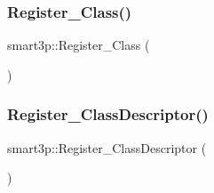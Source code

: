 \subsubsection{\texorpdfstring{Register\+\_\+\+Class()}{Register\_Class()}}
{\footnotesize\ttfamily smart3p\+::\+Register\+\_\+\+Class (\begin{DoxyParamCaption}\item[{\hyperlink{classsmart3p_1_1SMPacket}{S\+M\+Packet}}]{ }\end{DoxyParamCaption})}

\mbox{\label{namespacesmart3p_a688f712691acb3e8426a0252eba1329a}} 
\subsubsection{\texorpdfstring{Register\+\_\+\+Class\+Descriptor()}{Register\_ClassDescriptor()}}
{\footnotesize\ttfamily smart3p\+::\+Register\+\_\+\+Class\+Descriptor (\begin{DoxyParamCaption}\item[{\hyperlink{classsmart3p_1_1SMPacketDescriptor}{S\+M\+Packet\+Descriptor}}]{ }\end{DoxyParamCaption})}

